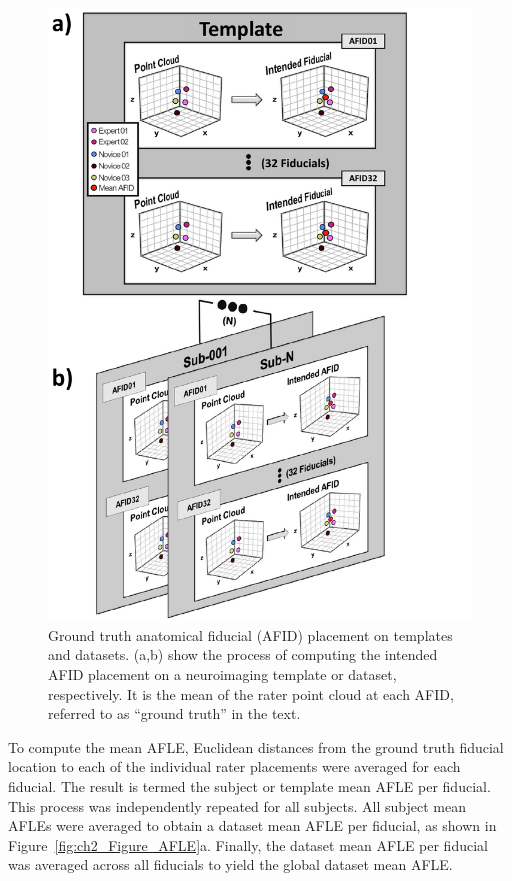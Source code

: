 \begin{figure}
    \centering
    \includegraphics[width=1\linewidth]{figs/ch2_Figure_GT.pdf}
    \caption{Ground truth anatomical fiducial (AFID) placement on templates and datasets. (a,b) show the process of computing the intended AFID placement on a neuroimaging template or dataset, respectively. It is the mean of the rater point cloud at each AFID, referred to as “ground truth” in the text.}
    \label{fig:ch2_Figure_GT}
\end{figure}

To compute the mean AFLE, Euclidean distances from the ground truth fiducial location to each of the individual rater placements were averaged for each fiducial. The result is termed the subject or template mean AFLE per fiducial. This process was independently repeated for all subjects. All subject mean AFLEs were averaged to obtain a dataset mean AFLE per fiducial, as shown in Figure~\ref{fig:ch2_Figure_AFLE}a. Finally, the dataset mean AFLE per fiducial was averaged across all fiducials to yield the global dataset mean AFLE. 

